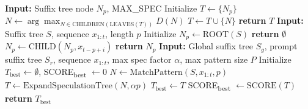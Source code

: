 \begin{algorithm}%
   \caption{Speculation Tree Generation}
   \label{alg:suffix-decoding}
   \footnotesize
\begin{algorithmic}
   \State \textbf{Input:} Suffix tree node $N_p$, MAX\_SPEC
   \State Initialize $T \gets \{ N_p \}$
   \State $N \gets \arg\max_{N \in \text{CHILDREN}(\text{LEAVES}(T))} D(N)$
   \State $T \gets T \cup \{ N \}$
   \EndWhile
   \State \textbf{return} $T$
\EndFunction
{}
   \State \textbf{Input:} Suffix tree $S$, sequence $x_{1:t}$, length $p$
   \State Initialize $N_p \gets \text{ROOT}(S)$
   \State \textbf{return} $\emptyset$
   \EndIf
   \State $N_p \gets \text{CHILD}(N_p, x_{t-p+i})$
   \EndFor
   \State \textbf{return} $N_p$
\EndFunction
{}
   \State \textbf{Input:} Global suffix tree $S_g$, prompt suffix tree $S_r$, sequence $x_{1:t}$, max spec factor $\alpha$, max pattern size $P$
   \State Initialize $T_{\text{best}} \gets \emptyset$, SCORE\textsubscript{best} $\gets 0$
   \State $N \gets \text{MatchPattern}(S, x_{1:t}, p)$
   \State $T \gets \text{ExpandSpeculationTree}(N, \alpha p)$
   \State $T_{\text{best}} \gets T$
   \State SCORE\textsubscript{best} $\gets \text{SCORE}(T)$
   \EndIf
   \EndFor
   \EndFor
   \State \textbf{return} $T_{\text{best}}$
\EndFunction
\end{algorithmic}
\end{algorithm}
